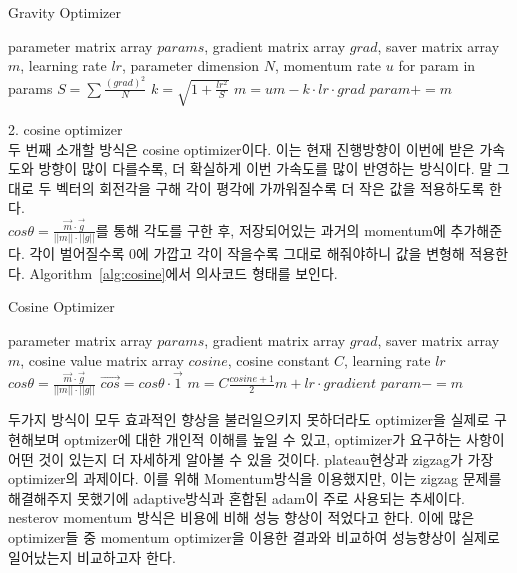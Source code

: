 \documentclass{article}
\begin{document}
\begin{algorithm}[tb]
   \caption{Gravity Optimizer}
   \label{alg:gravity}
\begin{algorithmic}
    parameter matrix array $params$, gradient matrix array $grad$, saver matrix array $m$, learning rate $lr$, parameter dimension $N$, momentum rate $u$
   \REPEAT
   \STATE for param in params
   \STATE $S=\sum{\frac{(grad)^2}{N}}$
   \STATE $k=\sqrt{1+\frac{lr^2}{S}}$
   \STATE $m=um-k\cdot lr\cdot grad$
   \STATE $param+=m$
   \ENDFOR
\end{algorithmic}
\end{algorithm}

2. cosine optimizer\\
두 번째 소개할 방식은 cosine optimizer이다. 이는 현재 진행방향이 이번에 받은 가속도와 방향이 많이 다를수록, 더 확실하게 이번 가속도를 많이 반영하는 방식이다. 말 그대로 두 벡터의 회전각을 구해 각이 평각에 가까워질수록 더 작은 값을 적용하도록 한다.\\$cos\theta=\frac{\vec{m}\cdot\vec{g}}{||m||\cdot||g||}$를 통해 각도를 구한 후, 저장되어있는 과거의 momentum에 추가해준다. 각이 벌어질수록 0에 가깝고 각이 작을수록 그대로 해줘야하니 값을 변형해 적용한다. Algorithm~\ref{alg:cosine}에서 의사코드 형태를 보인다.

\begin{algorithm}[tb]
   \caption{Cosine Optimizer}
   \label{alg:cosine}
\begin{algorithmic}
    parameter matrix array $params$, gradient matrix array $grad$, saver matrix array $m$, cosine value matrix array $cosine$, cosine constant $C$, learning rate $lr$
   \REPEAT
   \STATE $cos\theta=\frac{\vec{m}\cdot\vec{g}}{||m||\cdot||g||}$
   \STATE $\vec{cos}=cos\theta\cdot\vec{1}$
   \ENDFOR
   \STATE $m=C \frac{cosine+1}{2}m+lr\cdot gradient$
   \STATE $param-=m$
   \ENDFOR
\end{algorithmic}
\end{algorithm}

두가지 방식이 모두 효과적인 향상을 불러일으키지 못하더라도 optimizer을 실제로 구현해보며 optmizer에 대한 개인적 이해를 높일 수 있고, optimizer가 요구하는 사항이 어떤 것이 있는지 더 자세하게 알아볼 수 있을 것이다.
plateau현상과 zigzag가 가장 optimizer의 과제이다. 이를 위해 Momentum방식을 이용했지만, 이는 zigzag 문제를 해결해주지 못했기에 adaptive방식과 혼합된 adam이 주로 사용되는 추세이다. nesterov momentum 방식은 비용에 비해 성능 향상이 적었다고 한다. 이에 많은 optimizer들 중 momentum optimizer을 이용한 결과와 비교하여 성능향상이 실제로 일어났는지 비교하고자 한다.
\end{document}
